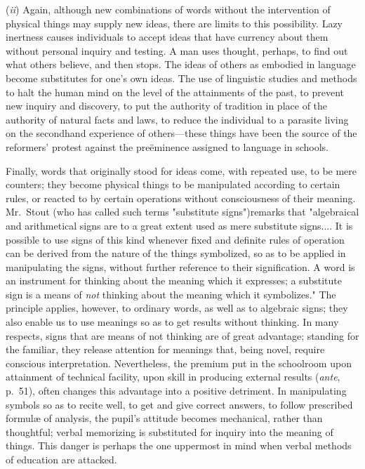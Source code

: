 \documentclass[showtrims,ustradepaper]{memoir}
\begin{document}

(\emph{ii}) Again, although new combinations of words without the
intervention of physical things may supply new ideas, there are limits
to this possibility. Lazy inertness causes individuals to accept ideas
that have currency about them without personal inquiry and testing. A
man uses thought, perhaps, to find out what others believe, and then
stops. The ideas of others as embodied in language become substitutes
for one's own ideas. The use of linguistic studies and methods to halt
the human mind on the level of the attainments of the past, to prevent
new inquiry and discovery, to put the authority of tradition in place of
the authority of natural facts and laws, to reduce the individual to a
parasite living on the secondhand experience of others---these things
have been the source of the reformers' protest against the preëminence
assigned to language in schools.


Finally, words that originally stood for ideas come, with repeated use,
to be mere counters; they become physical things to be manipulated
according to certain rules, or reacted to by certain operations without
consciousness of their meaning. Mr.\ Stout (who has called such terms
"substitute signs")remarks that "algebraical and arithmetical signs are
to a great extent used as mere substitute signs.... It is possible to
use signs of this kind whenever fixed and definite rules of
operation
can be derived from the nature of the things symbolized, so as to be
applied in manipulating the signs, without further reference to their
signification. A word is an instrument for thinking about the meaning
which it expresses; a substitute sign is a means of \emph{not} thinking
about the meaning which it symbolizes." The principle applies, however,
to ordinary words, as well as to algebraic signs; they also enable us to
use meanings so as to get results without thinking. In many respects,
signs that are means of not thinking are of great advantage; standing
for the familiar, they release attention for meanings that, being novel,
require conscious interpretation. Nevertheless, the premium put in the
schoolroom upon attainment of technical facility, upon skill in
producing external results (\emph{ante}, p.\ 51), often changes this
advantage into a positive detriment. In manipulating symbols so as to
recite well, to get and give correct answers, to follow prescribed
formulæ of analysis, the pupil's attitude becomes mechanical, rather
than thoughtful; verbal memorizing is substituted for inquiry into the
meaning of things. This danger is perhaps the one uppermost in mind when
verbal methods of education are attacked.
\end{document}
